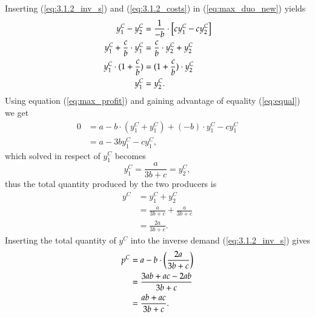 \documentclass[12pt]{article}
\numberwithin{equation}{subsection}
\begin{document}
Inserting (\ref{eq:3.1.2_inv_s}) and (\ref{eq:3.1.2_costs}) in (\ref{eq:max_duo_new}) yields \begin{align}
\label{eq:equal}
y^C_1 - y^C_2 & = \frac{1}{- b} \cdot \left[cy^C_1 - cy^C_2 \right]\notag \\
y^C_1 + \frac{c}{b} \cdot y^C_1 & = \frac{c}{b} \cdot y^C_2 + y^C_2 \notag \\
y^C_1 \cdot (1 + \frac{c}{b}) & = (1 + \frac{c}{b}) \cdot y^C_2 \notag \\
y^C_1 &= y^C_2.
\end{align}
Using equation (\ref{eq:max_profit}) and gaining advantage of equality (\ref{eq:equal}) we get \begin{align*}
0 & = a - b \cdot (y^C_1 + y^C_1) + (- b) \cdot y^C_1 - cy^C_1 \\
 &= a - 3by^C_1 - cy^C_1,
\end{align*}
which solved in respect of $y^C_1$ becomes\begin{equation}
\label{eq:solve_c}
y^C_1 = \frac{a}{3b + c} = y^C_2,
\end{equation} thus the total quantity produced by the two producers is \begin{align*}
y^C &= y^C_1 + y^C_2 	 \\
& = \frac{a}{3b + c} + \frac{a}{3b + c} \\
& = \frac{2a}{3b + c}.
\end{align*} Inserting the total quantity of $y^C$ into the inverse demand (\ref{eq:3.1.2_inv_s}) gives \begin{align}
\label{eq:price_duo_c}
p^C  &= a - b \cdot \left(\frac{2a}{3b + c}\right) \notag \\
&= \frac{3ab + ac - 2ab}{3b + c} \notag \\
& = \frac{ab + ac}{3b + c}.
\end{align}
\end{document}
